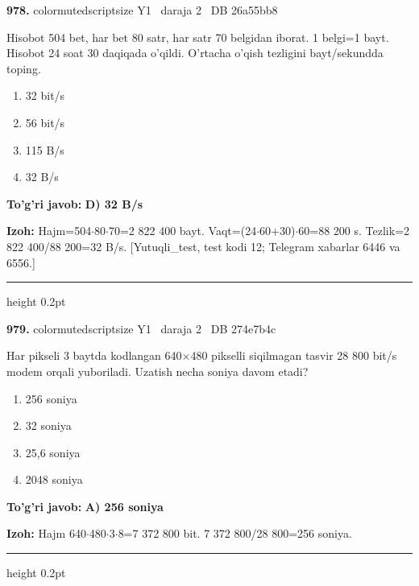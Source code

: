 \documentclass[10pt,a4paper,oneside]{article}
\begin{document}
\noindent\textbf{\color{ink}978.}  {color{muted}scriptsize Y1 \textbullet\ daraja 2 \textbullet\ DB 26a55bb8}
\par
Hisobot 504 bet, har bet 80 satr, har satr 70 belgidan iborat. 1 belgi=1 bayt. Hisobot 24 soat 30 daqiqada o'qildi. O'rtacha o'qish tezligini bayt/sekundda toping.
\begin{enumerate}[label=\Alph*),leftmargin=9mm]
\item 32 bit/s
\item 56 bit/s
\item 115 B/s
\item 32 B/s
\end{enumerate}
\begin{tcolorbox}[enhanced,breakable,colback=teal!4,colframe=teal!50!black,boxrule=0.5pt,arc=1.1mm,left=3mm,right=3mm,top=1.7mm,bottom=1.7mm,before skip=2mm,after skip=2mm]
\textbf{\color{teal}To'g'ri javob:} \textbf{D) 32 B/s}
\par\smallskip
\textbf{Izoh:} Hajm=504\ensuremath{\cdot}80\ensuremath{\cdot}70=2 822 400 bayt. Vaqt=(24\ensuremath{\cdot}60+30)\ensuremath{\cdot}60=88 200 s. Tezlik=2 822 400/88 200=32 B/s. [Yutuqli\_test, test kodi 12; Telegram xabarlar 6446 va 6556.]
\end{tcolorbox}
\vspace{2mm}\hrule height 0.2pt \vspace{3mm}

\noindent\textbf{\color{ink}979.}  {color{muted}scriptsize Y1 \textbullet\ daraja 2 \textbullet\ DB 274e7b4c}
\par
Har pikseli 3 baytda kodlangan 640\ensuremath{\times}480 pikselli siqilmagan tasvir 28 800 bit/s modem orqali yuboriladi. Uzatish necha soniya davom etadi?
\begin{enumerate}[label=\Alph*),leftmargin=9mm]
\item 256 soniya
\item 32 soniya
\item 25,6 soniya
\item 2048 soniya
\end{enumerate}
\begin{tcolorbox}[enhanced,breakable,colback=teal!4,colframe=teal!50!black,boxrule=0.5pt,arc=1.1mm,left=3mm,right=3mm,top=1.7mm,bottom=1.7mm,before skip=2mm,after skip=2mm]
\textbf{\color{teal}To'g'ri javob:} \textbf{A) 256 soniya}
\par\smallskip
\textbf{Izoh:} Hajm 640\ensuremath{\cdot}480\ensuremath{\cdot}3\ensuremath{\cdot}8=7 372 800 bit. 7 372 800/28 800=256 soniya.
\end{tcolorbox}
\vspace{2mm}\hrule height 0.2pt \vspace{3mm}
\end{document}
